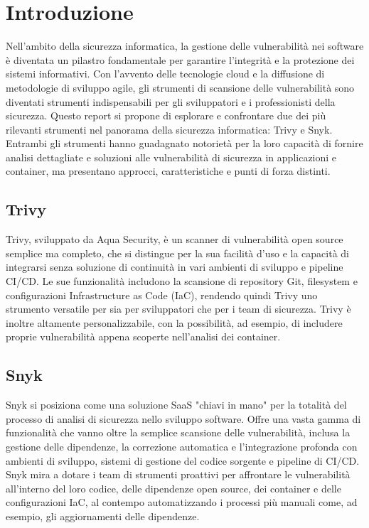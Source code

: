 \chapter{Introduzione}
Nell'ambito della sicurezza informatica, la gestione delle vulnerabilità nei software è diventata un pilastro fondamentale per garantire l'integrità e la protezione dei sistemi informativi. Con l'avvento delle tecnologie cloud e la diffusione di metodologie di sviluppo agile, gli strumenti di scansione delle vulnerabilità sono diventati strumenti indispensabili per gli sviluppatori e i professionisti della sicurezza. Questo report si propone di esplorare e confrontare due dei più rilevanti strumenti nel panorama della sicurezza informatica: Trivy e Snyk. Entrambi gli strumenti hanno guadagnato notorietà per la loro capacità di fornire analisi dettagliate e soluzioni alle vulnerabilità di sicurezza in applicazioni e container, ma presentano approcci, caratteristiche e punti di forza distinti.

\section*{Trivy}

Trivy\cite{trivy_main}, sviluppato da Aqua Security, è un scanner di vulnerabilità open source semplice ma completo, che si distingue per la sua facilità d'uso e la capacità di integrarsi senza soluzione di continuità in vari ambienti di sviluppo e pipeline CI/CD. Le sue funzionalità includono la scansione di repository Git, filesystem e configurazioni Infrastructure as Code (IaC), rendendo quindi Trivy uno strumento versatile per sia per sviluppatori che per i team di sicurezza. Trivy è inoltre altamente personalizzabile, con la possibilità, ad esempio, di includere proprie vulnerabilità appena scoperte nell'analisi dei container.

\section*{Snyk}

Snyk\cite{snyk_main} si posiziona come una soluzione SaaS "chiavi in mano" per la totalità del processo di analisi di sicurezza nello sviluppo software. Offre una vasta gamma di funzionalità che vanno oltre la semplice scansione delle vulnerabilità, inclusa la gestione delle dipendenze, la correzione automatica e l'integrazione profonda con ambienti di sviluppo, sistemi di gestione del codice sorgente e pipeline di CI/CD. Snyk mira a dotare i team di strumenti proattivi per affrontare le vulnerabilità all'interno del loro codice, delle dipendenze open source, dei container e delle configurazioni IaC, al contempo automatizzando i processi più manuali come, ad esempio, gli aggiornamenti delle dipendenze.

